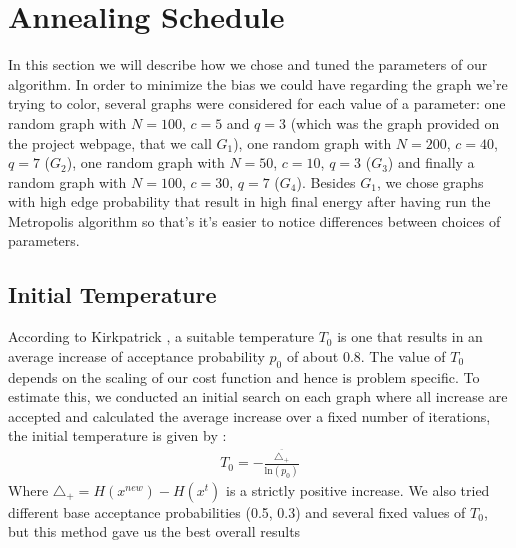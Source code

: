 \documentclass[a4paper]{article}
\begin{document}
\section{Annealing Schedule}
In this section we will describe how we chose and tuned the parameters of our algorithm. In order to minimize the bias we could have regarding the graph we're trying to color, several graphs were considered for each value of a parameter: one random graph with $N=100$, $c=5$ and $q=3$ (which was the graph provided on the project webpage, that we call $G_1$), one random graph with $N=200$, $c=40$, $q=7$ ($G_2$), one random graph with $N=50$, $c=10$, $q=3$ ($G_3$) and finally a random graph with $N=100$, $c=30$, $q=7$ ($G_4$). Besides $G_1$, we chose graphs with high edge probability that result in high final energy after having run the Metropolis algorithm so that's it's easier to notice differences between choices of parameters.

\subsection{Initial Temperature}
According to Kirkpatrick \cite{kirkpatrick}, a suitable temperature $T_0$ is one that results in an average increase of acceptance probability $p_0$ of about 0.8. The value of $T_0$ depends on the scaling of our cost function and hence is problem specific. To estimate this, we conducted an initial search on each graph where all increase are accepted and calculated the average increase over a fixed number of iterations, the initial temperature is given by :
\begin{align*}
T_0 = -\frac{\overline{\triangle_+}}{\mathrm{ln}(p_0)}
\end{align*}
Where $\triangle_+ = H(x^{new}) - H(x^t)$ is a strictly positive increase. We also tried different base acceptance probabilities (0.5, 0.3) and several fixed values of $T_0$, but this method gave us the best overall results
\end{document}
